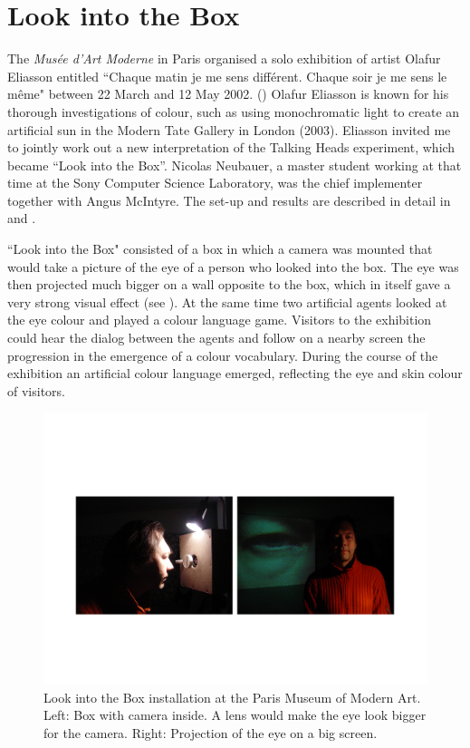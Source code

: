 \section{Look into the Box} 

The {\itshape Mus\'ee d'Art Moderne} in Paris organised a solo exhibition of artist Olafur Eliasson entitled 
``Chaque matin je me sens diff\'erent. Chaque soir je me sens le m\^eme" between 
22 March and 12 May 2002. (\citealt{Scherf:2002}) Olafur Eliasson is known for his thorough 
investigations of colour, such as using monochromatic light to create an artificial sun in the Modern Tate
Gallery in London (2003). Eliasson invited me to jointly work out a new interpretation of the 
Talking Heads experiment, which became ``Look into the Box''. Nicolas Neubauer, a master student working at 
that time at the Sony Computer Science Laboratory, was the chief implementer together with Angus McIntyre.  
The set-up and results are described in detail in \cite{Steels:2004} and \cite{Neubauer:2004}.

``Look into the Box" consisted of a box in which a camera was mounted that would take a picture of the 
eye of a person who looked into the box. The eye was then projected much bigger on a wall opposite to the box, 
which in itself gave a very strong visual effect (see ). 
At the same time two artificial agents looked at the 
eye colour and played a colour language game. Visitors to the exhibition could hear the dialog between the agents 
and follow on a nearby screen the progression in the emergence of a colour vocabulary. During the course of the 
exhibition an artificial colour language emerged, reflecting the eye and skin colour of visitors. 

\begin{figure}[htbp]
  \centerline{\includegraphics[width=.95\textwidth]{chap9/figs/look-into-box.pdf}}
\caption{\label{fig:lookintobox}Look into the Box installation at the Paris Museum of Modern Art. Left: Box with camera inside. A lens would make 
the eye look bigger for the camera. Right: Projection of the eye on a big screen.}
\end{figure}

